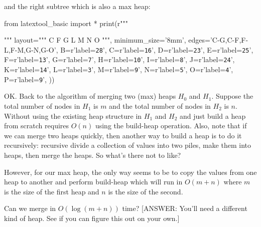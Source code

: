 and the right subtree which is also a max heap:

\begin{python}
from latextool_basic import *
print(r"""
\begin{center}
\end{center}
""" %
layout="""
            C 
          F   G
         L M N O
""",
minimum_size='8mm',
edges='C-G,C-F,F-L,F-M,G-N,G-O',
B=r'label=\texttt{28}',
C=r'label=\texttt{16}',
D=r'label=\texttt{23}',
E=r'label=\texttt{25}',
F=r'label=\texttt{13}',
G=r'label=\texttt{7}',
H=r'label=\texttt{10}',
I=r'label=\texttt{8}',
J=r'label=\texttt{24}',
K=r'label=\texttt{14}',
L=r'label=\texttt{3}',
M=r'label=\texttt{9}',
N=r'label=\texttt{5}',
O=r'label=\texttt{4}',
P=r'label=\texttt{9}',
))
\end{python}

OK.
Back to the algorithm of merging two (max) heaps $H_0$ and $H_1$.
Suppose the total number of nodes in $H_1$ is $m$
and the total number of nodes in $H_2$ is $n$.
Without using the existing heap structure in $H_1$ and $H_2$
and just build a heap from scratch requires $O(n)$ using the build-heap
operation.
Also, note that if we can merge two heaps quickly,
then another way to build a heap is to do it recursively:
recursive divide a collection of values into two piles,
make them into heaps, then merge the heaps.
So what's there not to like?

However, for our max heap, the only way seems to be to copy the
values from one heap to another and perform build-heap
which will run in $O(m + n)$
where $m$ is the size of the first heap and $n$ is the size of the second.


\begin{ex}
Can we merge in $O(\log (m + n))$ time?
[ANSWER: You'll need a different kind of heap.
See if you can figure this out on your own.]
\end{ex}




